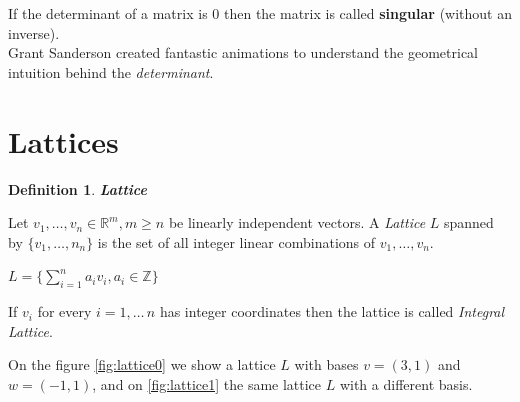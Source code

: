 \documentclass[a4paper,12pt]{report}
\newtheorem{definition}{Definition}[section]
\newcommand{\R}{\mathbb{R}}
\newcommand{\Z}{\mathbb{Z}}
\begin{document}
If the determinant of a matrix is $0$ then the matrix is called \textbf{singular} (without an inverse).\\

Grant Sanderson created fantastic animations to understand the geometrical intuition behind the \textit{determinant}\cite{determinant}.

\section{Lattices}

\begin{definition}
    \textbf{Lattice}
\end{definition}

Let $v_1,\ldots,v_n \in \R^m, m \ge n$ be linearly independent vectors. A \textit{Lattice} $L$ spanned by $\{v_1,\ldots,n_n\}$ is the set of 
all integer linear combinations of $v_1,\ldots,v_n$.

\begin{center}
    $L = \bigg\{\sum_{i=1}^{n} a_iv_i, a_i \in \Z \bigg\}$
\end{center}

If $v_i$ for every $i = 1,\ldots\,n$ has integer coordinates then the lattice is
called \textit{Integral Lattice}.

On the figure \ref{fig:lattice0} we show a lattice $L$ with bases $v=(3, 1)$ and $w=(-1, 1)$, and on \ref{fig:lattice1} the same lattice $L$ with
a different basis.
\end{document}
